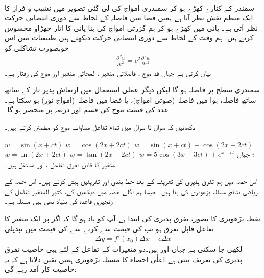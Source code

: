 \\
سمندر  کے کنارے کھڑے  ہو کر سمندری امواج کی لی گئی  تصویر  میں نشیب و فراز کا   ایک منظم نقش نظر آتا ہے۔ہمیں  فضا میں  فاصلہ کے لحاظ سے   دوری انتصابی حرکت نظر آتی ہے۔ پانی میں کھڑے ہو کر ہم گزرتی امواج کی بنا پانی کا اتار چھڑاو محسوس کرتے ہیں۔ ہم وقت کے لحاظ سے دوری انتصابی حرکت  دیکھتے ہیں۔طبیعیات  میں اس خوبصورت   تشاکلی کو 
\begin{align}
\frac{\partial^{\,2}u}{\partial t^2}=c^2\frac{\partial ^{\,2}w}{\partial x^2}
\end{align}
بیان کرتی ہے جہاں  قد موج  ، فاصلاتی متغیر  ، لمحاتی متغیر  اور موج کی رفتار    ہے۔ 

سمندری سطح پر فاصلہ  ہو گا لیکن دیگر عملی استعمال میں   ارتعاش پذیر  تار کے ساتھ ساتھ  فاصلہ، ہوا میں فاصلہ (صوتی امواج)، یا فضا میں فاصلہ  (امواج نور)  ہو سکتا ہے۔  عدد  کی قیمت موج کی قسم اور  ذریعہ پر منحصر ہو  گا۔

دکھائیں کہ سوال  تا سوال   میں تمام  تفاعل مساوات موج کو مطمئن کرتے ہیں۔ 

$w=\sin(x+ct)$
$w=\cos(2x+2ct)$
$w=\sin(x+ct)+\cos(2x+2ct)$
$w=\ln(2x+2ct)$
$w=\tan(2x-2ct)$
$w=5\cos(3x+3ct)+e^{x+ct}$
؛ جہاں  متغیر  کا قابل تفرق تفاعل ،   اور   مستقل ہیں۔




اس حصہ میں ہم تفرق پذیری کی تعریف    کے بعد  خط بندی اور تفریقیں  پیش کرتے ہیں۔ اس حصہ کے  ریاضی نتائج مسئلہ  بڑھوتری کی بنا ہیں۔ جیسا ہم اگلے حصہ میں دیکھیں گے، کثیر المتغیر تفاعل کے  زنجیری قاعدہ  کی بنیاد بھی یہی مسئلہ ہے۔

 نقطہ  بڑھوتری کا تصور،   تفرق پذیری کی   ابتدا ہے۔آپ کو یاد ہو گا کہ اگر  پر ایک متغیر کا تفاعل  قابل تفرق ہو  تب  کی قیمت  سے    کرنے سے  کی قیمت میں تبدیلی 
\begin{align}
\Delta y=f'(x_0)\Delta x+\epsilon \Delta x
\end{align}
لکھی جا سکتی ہے جہاں  اور  ہیں۔دو متغیرات کے تفاعل  کے لئے   یہی خاصیت تفرق پذیری کی تعریف  بنتی ہے۔اعلٰی  احصاء کا   مسئلہ بڑھوتری ہمیں یقین دلاتا ہے کہ یہ خاصیت  کار آمد رہے گی:

